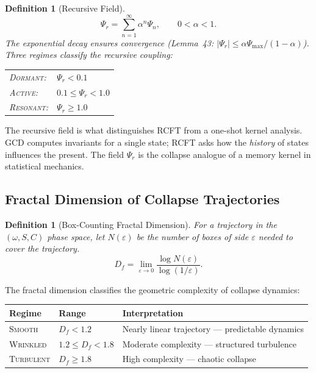 \documentclass[
  aps,
  prd,
  preprint,
  superscriptaddress,
  nofootinbib,
  floatfix,
  longbibliography
]{revtex4-2}
\newtheorem{definition}[theorem]{Definition}
\newcommand{\eps}{\varepsilon}
\newcommand{\beq}{\begin{equation}}
\newcommand{\eeq}{\end{equation}}
\newcommand{\regime}[1]{\textnormal{\textsc{#1}}}
\newcommand{\Drft}{\omega}
\newcommand{\Ent}{S}
\newcommand{\Curv}{C}
\newcommand{\Psifield}{\Psi}
\newcommand{\Psirec}{\Psi_{r}}
\begin{document}
\begin{definition}[Recursive Field]\label{def:psi_rec}
\beq
  \Psirec = \sum_{n=1}^{\infty} \alpha^n \Psifield_n,
  \qquad 0 < \alpha < 1.
\eeq
The exponential decay ensures convergence
(Lemma~43: $|\Psirec| \leq \alpha \Psifield_{\max} / (1-\alpha)$).
Three regimes classify the recursive coupling:
\begin{center}
\begin{tabular}{@{}ll@{}}
\regime{Dormant}:   & $\Psirec < 0.1$ \\
\regime{Active}:    & $0.1 \leq \Psirec < 1.0$ \\
\regime{Resonant}:  & $\Psirec \geq 1.0$ \\
\end{tabular}
\end{center}
\end{definition}

The recursive field is what distinguishes RCFT from
a one-shot kernel analysis.
GCD computes invariants for a single state; RCFT asks
how the \emph{history} of states influences the present.
The field $\Psirec$ is the collapse analogue of a
memory kernel in statistical mechanics.

\subsection{Fractal Dimension of Collapse Trajectories}

\begin{definition}[Box-Counting Fractal Dimension]\label{def:Df}
For a trajectory in the $(\Drft, \Ent, \Curv)$
phase space, let $N(\eps)$ be the number of boxes of
side $\eps$ needed to cover the trajectory.
\beq
  D_f = \lim_{\eps \to 0}
    \frac{\log N(\eps)}{\log(1/\eps)}.
\eeq
\end{definition}

The fractal dimension classifies the geometric
complexity of collapse dynamics:

\begin{center}
\begin{tabular}{@{}lll@{}}
\toprule
\textbf{Regime} & \textbf{Range} & \textbf{Interpretation} \\
\midrule
\regime{Smooth} & $D_f < 1.2$ &
  Nearly linear trajectory — predictable dynamics \\
\regime{Wrinkled} & $1.2 \leq D_f < 1.8$ &
  Moderate complexity — structured turbulence \\
\regime{Turbulent} & $D_f \geq 1.8$ &
  High complexity — chaotic collapse \\
\bottomrule
\end{tabular}
\end{center}
\end{document}

